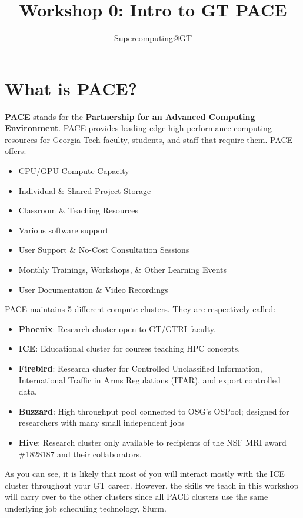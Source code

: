 \documentclass{article}
\title{Workshop 0: Intro to GT PACE}
\author{Supercomputing@GT}
\date{}
\begin{document}
\maketitle

\tableofcontents

\section{What is PACE?}

\textbf{PACE} stands for the \textbf{Partnership for an Advanced Computing Environment}. PACE provides leading-edge high-performance computing resources for Georgia Tech faculty, students, and staff that require them. PACE offers:

\begin{itemize}
    \item CPU/GPU Compute Capacity
    \item Individual \& Shared Project Storage
    \item Classroom \& Teaching Resources 
    \item Various software support 
    \item User Support \& No-Cost Consultation Sessions 
    \item Monthly Trainings, Workshops, \& Other Learning Events 
    \item User Documentation \& Video Recordings 
\end{itemize}

\noindent PACE maintains 5 different compute clusters. They are respectively called:

\begin{itemize}
    \item \textbf{Phoenix}: Research cluster open to GT/GTRI faculty. 
    \item \textbf{ICE}: Educational cluster for courses teaching HPC concepts. 
    \item \textbf{Firebird}: Research cluster for Controlled Unclassified Information, International Traffic in Arms Regulations (ITAR), and export controlled data.
    \item \textbf{Buzzard}: High throughput pool connected to OSG's OSPool; designed for researchers with many small independent jobs
    \item \textbf{Hive}: Research cluster only available to recipients of the NSF MRI award \#1828187 and their collaborators.
\end{itemize}

\noindent As you can see, it is likely that most of you will interact mostly with the ICE cluster throughout your GT career. However, the skills we teach in this workshop will carry over to the other clusters since all PACE clusters use the same underlying job scheduling technology, Slurm. 
\end{document}
